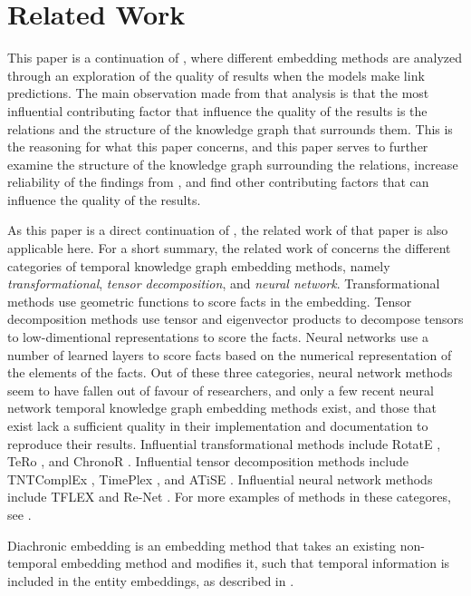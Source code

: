 \section{Related Work}
\label{sec:related-work}

This paper is a continuation of \cite{P9}, where different embedding methods are analyzed through an exploration of the quality of results when the models make link predictions. The main observation made from that analysis is that the most influential contributing factor that influence the quality of the results is the relations and the structure of the knowledge graph that surrounds them. This is the reasoning for what this paper concerns, and this paper serves to further examine the structure of the knowledge graph surrounding the relations, increase reliability of the findings from \cite{P9}, and find other contributing factors that can influence the quality of the results.

As this paper is a direct continuation of \cite{P9}, the related work of that paper is also applicable here. For a short summary, the related work of \cite{P9} concerns the different categories of temporal knowledge graph embedding methods, namely \textit{transformational}, \textit{tensor decomposition}, and \textit{neural network}. Transformational methods use geometric functions to score facts in the embedding. Tensor decomposition methods use tensor and eigenvector products to decompose tensors to low-dimentional representations to score the facts. Neural networks use a number of learned layers to score facts based on the numerical representation of the elements of the facts. Out of these three categories, neural network methods seem to have fallen out of favour of researchers, and only a few recent neural network temporal knowledge graph embedding methods exist, and those that exist lack a sufficient quality in their implementation and documentation to reproduce their results. Influential transformational methods include RotatE \cite{sun2019rotate}, TeRo \cite{xu2020tero}, and ChronoR \cite{sadeighan2021chronor}. Influential tensor decomposition methods include TNTComplEx \cite{lacroix2020tcomplex}, TimePlex \cite{jain2020timeplex}, and ATiSE \cite{xu19atise}. Influential neural network methods include TFLEX \cite{lin22tflex} and Re-Net \cite{jin2019renet}. For more examples of methods in these categores, see \cite{P9}.

Diachronic embedding is an embedding method that takes an existing non-temporal embedding method and modifies it, such that temporal information is included in the entity embeddings, as described in \cite{goel19diachronicemb}. 

